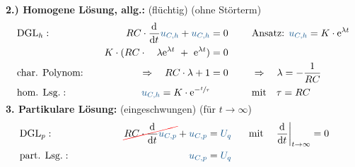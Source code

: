 {\begin{frame}
\textbf{2.) Homogene Lösung, allg.:} (flüchtig) (ohne Störterm)\\[-1em]
\begin{align*}
&\text{DGL}_{h}:&
    RC \cdot \dt \ecv{u_{C,h}} + \ecv{u_{C,h}} &= 0 &
        &\text{Ansatz: }
        \ecv{u_{C,h}} = K \cdot \mathrm{e}^{\lambda t}\\
&& K \cdot(
    RC \cdot \quad\lambda \mathrm{e}^{\lambda t}\ +\ \mathrm{e}^{\lambda t}) &= 0 \\
&\text{char. Polynom:}&\Rightarrow\quad
    RC \cdot \lambda + 1 &= 0
        &&\Rightarrow\quad \lambda = -\frac{1}{RC} \\
&\text{hom. Lsg.}:&
    \ecv{u_{C,h}} = K \cdot \mathrm{e}^{-\sfrac{t}{\tau}}&
        &&\text{mit}\quad \tau = RC
\\[-15pt]&\hphantom{R1oooooooooo}&\hphantom{L2oooooooooooooooooooooo}&\hphantom{R2oooo}&&\hphantom{R3oooooooooooooooooo}%
\end{align*}
\pause%
\textbf{3. Partikulare Lösung:} (eingeschwungen) (für $t \to \infty$)\\[-1em]
\begin{align*}
&\text{DGL}_{p}:&
    \redcancel{RC \cdot \dt \ecv{u_{C,p}}} + \ecv{u_{C,p}} &= \ecv{U_q}
        &&\text{mit}\quad \left.\dt\right|_{t \to \infty} = 0  \\
&\text{part. Lsg.}:&
    \ecv{u_{C,p}} &= \ecv{U_q} %
\\[-15pt]&\hphantom{R1oooooooooo}&\hphantom{L2oooooooooooooooooooooo}&\hphantom{R2oooo}&&\hphantom{R3oooooooooooooooooo}%
\end{align*}%
\end{frame}


}
